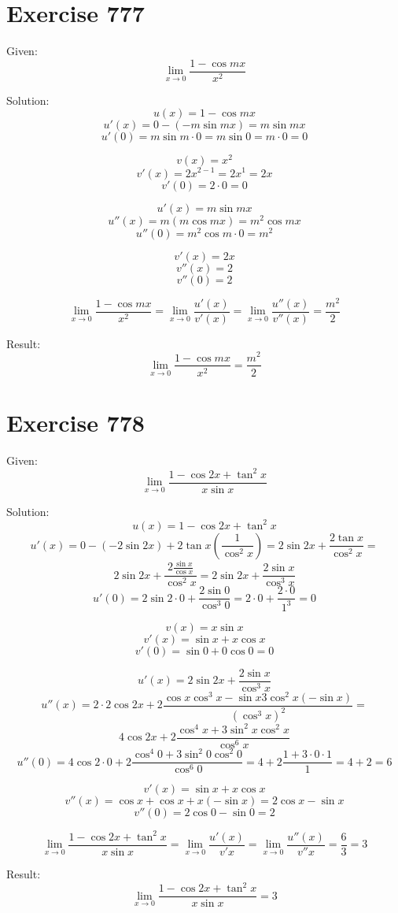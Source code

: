 \documentclass[a4paper, 10pt]{scrartcl}
\begin{document}
\section{Exercise 777}

Given:
\[
\lim_{x\to 0}{\frac{1 - \cos{mx}}{x^{2}}}
\]

Solution:
\[
u(x) = 1 - \cos{mx}
\]
\[
u'(x) = 0 - (-m\sin{mx}) = m\sin{mx}
\]
\[
u'(0) = m\sin{m\cdot 0} = m\sin{0} = m\cdot 0 = 0
\]

\[
v(x) = x^{2}
\]
\[
v'(x) = 2x^{2 - 1} = 2x^{1} = 2x
\]
\[
v'(0) = 2\cdot 0 = 0
\]

\[
u'(x) = m\sin{mx}
\]
\[
u''(x) = m(m\cos{mx}) = m^{2}\cos{mx}
\]
\[
u''(0) = m^{2}\cos{m\cdot 0} = m^{2}
\]

\[
v'(x) = 2x
\]
\[
v''(x) = 2
\]
\[
v''(0) = 2
\]

\[
\lim_{x\to 0}{\frac{1 - \cos{mx}}{x^{2}}} = \lim_{x\to 0}{\frac{u'(x)}{v'(x)}} = \lim_{x\to 0}{\frac{u''(x)}{v''(x)}}
= \frac{m^{2}}{2}
\]

Result:
\[
\lim_{x\to 0}{\frac{1 - \cos{mx}}{x^{2}}} = \frac{m^{2}}{2}
\]

\section{Exercise 778}

Given:
\[
\lim_{x\to 0}{\frac{1 - \cos{2x} + \tan^{2}{x}}{x\sin{x}}}
\]

Solution:
\[
u(x) = 1 - \cos{2x} + \tan^{2}{x}
\]
\[
u'(x) = 0 - (-2\sin{2x}) + 2\tan{x}(\frac{1}{\cos^{2}{x}}) = 2\sin{2x} + \frac{2\tan{x}}{\cos^{2}{x}} =
\]
\[
2\sin{2x} + \frac{2\frac{\sin{x}}{\cos{x}}}{\cos^{2}{x}} = 2\sin{2x} + \frac{2\sin{x}}{\cos^{3}{x}}
\]
\[
u'(0) = 2\sin{2\cdot 0} + \frac{2\sin{0}}{\cos^{3}{0}} = 2\cdot 0 + \frac{2\cdot 0}{1^{3}} = 0
\]

\[
v(x) = x\sin{x}
\]
\[
v'(x) = \sin{x} + x\cos{x}
\]
\[
v'(0) = \sin{0} + 0\cos{0} = 0
\]

\[
u'(x) = 2\sin{2x} + \frac{2\sin{x}}{\cos^{3}{x}}
\]
\[
u''(x) = 2\cdot 2\cos{2x} + 2\frac{\cos{x}\cos^{3}{x} - \sin{x}3\cos^{2}{x}(-\sin{x})}{(\cos^{3}{x})^{2}} =
\]
\[
4\cos{2x} + 2\frac{\cos^{4}{x} + 3\sin^{2}{x}\cos^{2}{x}}{\cos^{6}{x}}
\]
\[
u''(0) = 4\cos{2\cdot 0} + 2\frac{\cos^{4}{0} + 3\sin^{2}{0}\cos^{2}{0}}{\cos^{6}{0}} = 4 + 2\frac{1 + 3\cdot 0\cdot 1}{1} = 4 + 2 = 6
\]

\[
v'(x) = \sin{x} + x\cos{x}
\]
\[
v''(x) = \cos{x} + \cos{x} + x(-\sin{x}) = 2\cos{x} - \sin{x}
\]
\[
v''(0) = 2\cos{0} - \sin{0} = 2
\]

\[
\lim_{x\to 0}{\frac{1 - \cos{2x} + \tan^{2}{x}}{x\sin{x}}} = \lim_{x\to 0}{\frac{u'(x)}{v'{x}}} = \lim_{x\to 0}{\frac{u''(x)}{v''{x}}} =
\frac{6}{3} = 3
\]

Result:
\[
\lim_{x\to 0}{\frac{1 - \cos{2x} + \tan^{2}{x}}{x\sin{x}}} = 3
\]
\end{document}
